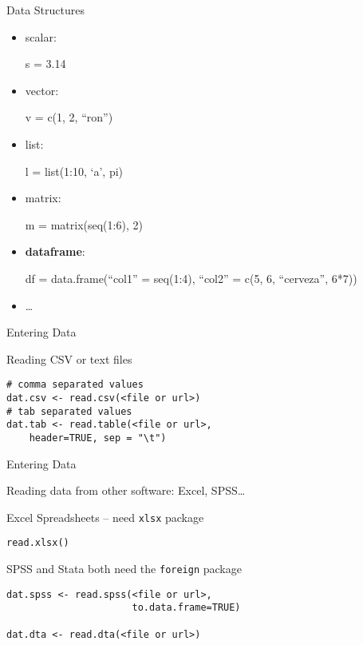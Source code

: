 \begin{frame}{Data Structures}

\begin{itemize}
\item
  scalar:

  s = 3.14
\item
  vector:

  v = c(1, 2, ``ron'')
\item
  list:

  l = list(1:10, `a', pi)
\item
  matrix:

  m = matrix(seq(1:6), 2)
\item
  \textbf{dataframe}:

  df = data.frame(``col1'' = seq(1:4), ``col2'' = c(5, 6, ``cerveza'',
  6*7))
\item
  \ldots{}
\end{itemize}

\end{frame}

\begin{frame}[fragile]{Entering Data}

\begin{block}{Reading CSV or text files}

\begin{verbatim}
# comma separated values
dat.csv <- read.csv(<file or url>)
# tab separated values
dat.tab <- read.table(<file or url>, 
    header=TRUE, sep = "\t")
\end{verbatim}

\end{block}

\end{frame}

\begin{frame}[fragile]{Entering Data}

\begin{block}{Reading data from other software: Excel, SPSS\ldots{}}

Excel Spreadsheets -- need \texttt{xlsx} package

\begin{verbatim}
read.xlsx()
\end{verbatim}

SPSS and Stata both need the \texttt{foreign} package

\begin{verbatim}
dat.spss <- read.spss(<file or url>, 
                      to.data.frame=TRUE)
             
dat.dta <- read.dta(<file or url>)
\end{verbatim}

\end{block}

\end{frame}

